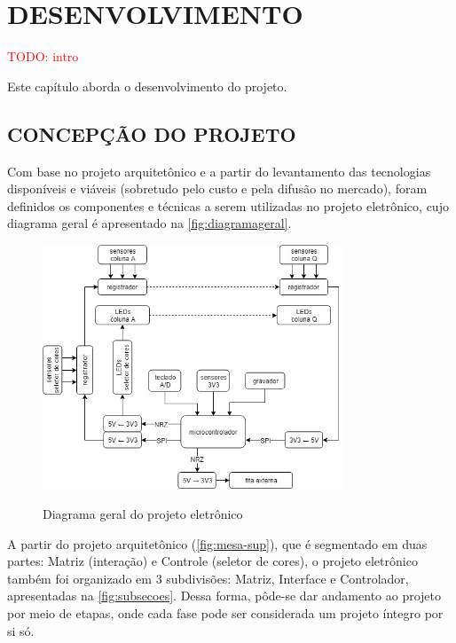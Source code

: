 
\chapter{DESENVOLVIMENTO}
\label{chap:metodologia}

\textcolor{red}{TODO: intro}

Este capítulo aborda o desenvolvimento do projeto.

\section{CONCEPÇÃO DO PROJETO}
\label{sec:concepcao}

Com base no projeto arquitetônico e a partir do levantamento das tecnologias disponíveis e viáveis (sobretudo pelo custo e pela difusão no mercado), foram definidos os componentes e técnicas a serem utilizadas no projeto eletrônico, cujo diagrama geral é apresentado na \autoref{fig:diagramageral}.

\begin{figure}[H]
    \centering
    \caption{Diagrama geral do projeto eletrônico}
    \includegraphics[width=0.8\textwidth]{./dados/figuras/diagrama}
    \label{fig:diagramageral}
\end{figure}

A partir do projeto arquitetônico (\autoref{fig:mesa-sup}), que é segmentado em duas partes: Matriz (interação) e Controle (seletor de cores), o projeto eletrônico também foi organizado em 3 subdivisões: Matriz, Interface e Controlador, apresentadas na \autoref{fig:subsecoes}. Dessa forma, pôde-se dar andamento ao projeto por meio de etapas, onde cada fase pode ser considerada um projeto íntegro por si só.


